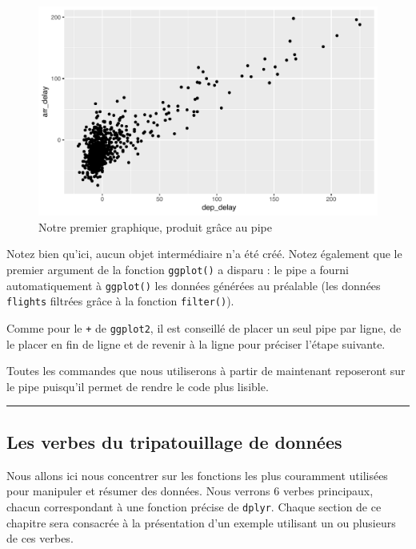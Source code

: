 \documentclass[a4paperpaper,]{article}
\begin{document}
\begin{figure}[htpb]

{\centering \includegraphics[width=0.9\linewidth]{figure/unnamed-chunk-93-1} 

}

\caption{Notre premier graphique, produit grâce au pipe}\label{fig:unnamed-chunk-93}
\end{figure}

Notez bien qu'ici, aucun objet intermédiaire n'a été créé. Notez également que le premier argument de la fonction \texttt{ggplot()} a disparu : le pipe a fourni automatiquement à \texttt{ggplot()} les données générées au préalable (les données \texttt{flights} filtrées grâce à la fonction \texttt{filter()}).

Comme pour le \texttt{+} de \texttt{ggplot2}, il est conseillé de placer un seul pipe par ligne, de le placer en fin de ligne et de revenir à la ligne pour préciser l'étape suivante.

Toutes les commandes que nous utiliserons à partir de maintenant reposeront sur le pipe puisqu'il permet de rendre le code plus lisible.

\begin{center}\rule{0.5\linewidth}{\linethickness}\end{center}

\hypertarget{les-verbes-du-tripatouillage-de-donnees}{%
\subsection{Les verbes du tripatouillage de données}\label{les-verbes-du-tripatouillage-de-donnees}}

Nous allons ici nous concentrer sur les fonctions les plus couramment utilisées pour manipuler et résumer des données. Nous verrons 6 verbes principaux, chacun correspondant à une fonction précise de \texttt{dplyr}. Chaque section de ce chapitre sera consacrée à la présentation d'un exemple utilisant un ou plusieurs de ces verbes.
\end{document}

